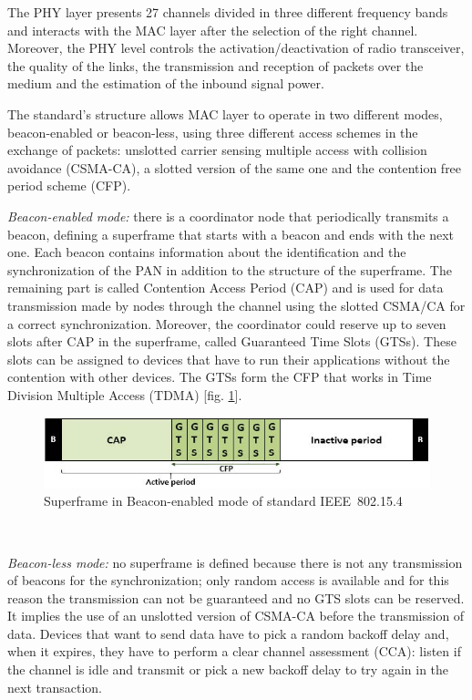 \documentclass[conference]{IEEEtran}
\begin{document}
The PHY layer presents 27 channels divided in three different frequency bands and interacts with the MAC layer after the selection of the right channel. Moreover, the PHY level controls the activation/deactivation of radio transceiver, the quality of the links, the transmission and reception of packets over the medium and the estimation of the inbound signal power.

The standard's structure allows MAC layer to operate in two different modes, beacon-enabled or beacon-less, using three different access schemes in the exchange of packets: unslotted carrier sensing multiple access with collision avoidance (CSMA-CA), a slotted version of the same one and the contention free period scheme (CFP).
\newline

\textit{Beacon-enabled mode:} there is a coordinator node that periodically transmits a beacon, defining a superframe that starts with a beacon and ends with the next one. Each beacon contains information about the identification and the synchronization of the PAN in addition to the structure of the superframe. The remaining part is called Contention Access Period (CAP) and is used for data transmission made by nodes through the channel using the slotted CSMA/CA for a correct synchronization. Moreover, the coordinator could reserve up to seven slots after CAP in the superframe, called Guaranteed Time Slots (GTSs). These slots can be assigned to devices that have to run their applications without the contention with other devices. The GTSs form the CFP that works in Time Division Multiple Access (TDMA) [fig. \ref{fig_beaconenabled}].
\newline

\begin{figure}[htbp]
	\centering
	\includegraphics[width=0.9\linewidth]{img/beaconSuperframe.jpg}
	\caption{Superframe in Beacon-enabled mode of standard IEEE~802.15.4}
	\label{fig_beaconenabled}
\end{figure}\



\textit{Beacon-less mode:} no superframe is defined because there is not any transmission of beacons for the synchronization; only random access is available and for this reason the transmission can not be guaranteed and no GTS slots can be reserved. It implies the use of an unslotted version of CSMA-CA before the transmission of data. Devices that want to send data have to pick a random backoff delay and, when it expires, they have to perform a clear channel assessment (CCA): listen if the channel is idle and transmit or pick a new backoff delay to try again in the next transaction. 
\newline
\end{document}
